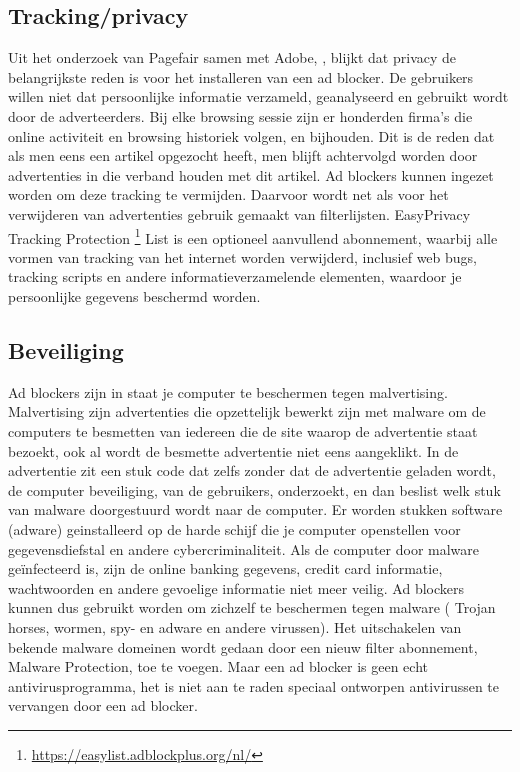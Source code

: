 \documentclass[pdftex,a4paper,12pt,twoside]{report}
\begin{document}
\subsection{Tracking/privacy}
\label{sec tracking/privacy}
Uit het onderzoek van Pagefair samen met Adobe, \cite{PageFair2015}, blijkt dat privacy de belangrijkste reden is voor het installeren van een ad blocker. De gebruikers willen niet dat persoonlijke informatie verzameld, geanalyseerd en gebruikt wordt door de adverteerders. Bij elke browsing sessie zijn er honderden firma's die online activiteit en browsing historiek volgen, en bijhouden. Dit is de reden dat als men eens een artikel opgezocht heeft, men blijft achtervolgd worden door advertenties in die verband houden met dit artikel. Ad blockers kunnen ingezet worden om deze tracking te vermijden. Daarvoor wordt net als voor het verwijderen van advertenties gebruik gemaakt van filterlijsten. EasyPrivacy Tracking Protection \footnote{\url{https://easylist.adblockplus.org/nl/}} List is een optioneel aanvullend abonnement, waarbij alle vormen van tracking van het internet worden verwijderd, inclusief web bugs, tracking scripts en andere informatieverzamelende elementen, waardoor je persoonlijke gegevens beschermd worden.

\subsection{Beveiliging}
\label{sec Beveiliging}
Ad blockers zijn in staat je computer te beschermen tegen malvertising. Malvertising zijn advertenties die opzettelijk bewerkt zijn met malware om de computers te besmetten van iedereen die de site waarop de advertentie staat bezoekt, ook al wordt de besmette advertentie niet eens aangeklikt. 
In de advertentie zit een stuk code dat zelfs zonder dat de advertentie geladen wordt, de computer beveiliging, van de gebruikers, onderzoekt, en dan beslist welk stuk van malware doorgestuurd wordt naar de computer. Er worden stukken software (adware) geinstalleerd op de harde schijf die je computer openstellen voor gegevensdiefstal en andere cybercriminaliteit. Als de computer door malware geïnfecteerd is, zijn de online banking gegevens, credit card informatie, wachtwoorden en andere gevoelige informatie niet meer veilig. 
Ad blockers kunnen dus gebruikt worden om zichzelf te beschermen tegen malware ( Trojan horses, wormen, spy- en adware en andere virussen). Het uitschakelen van bekende malware domeinen wordt gedaan door een nieuw filter abonnement, Malware Protection, toe te voegen. Maar een ad blocker is geen echt antivirusprogramma, het is niet aan te raden speciaal ontworpen antivirussen te vervangen door een ad blocker. 
\end{document}
